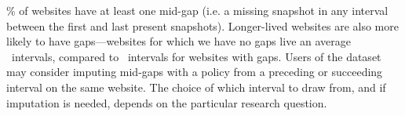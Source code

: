 {\midgapsDomainsPerc\% of websites have at least one mid-gap (i.e. a missing snapshot in any interval between the first and last present snapshots). Longer-lived websites are also more likely to have gaps---websites for which we have no gaps live an average \lifespanNoGaps~intervals, compared to \lifespanGaps~intervals for websites with gaps. Users of the dataset may consider imputing mid-gaps with a policy from a preceding or succeeding interval on the same website. The choice of which interval to draw from, and if imputation is needed, depends on the particular research question.
}
\iffalse

Overall stats (e.g. perc of possible policies that are gaps)
Only do overall stats for websites that have a rank
Gap distribution based on w-i pairs with rank
Focus on mid-gaps, only briefly touch on pre/post gaps
median number of mid-gaps
Optional: how long do mid-gaps run?
Longevity: median(last\_year - start\_year)
\fi

\begin{comment}
For a missing snapshot, we categorize the missing data as follows (also illustrated in Figure \ref{fig:missing_types}):
\begin{itemize}
    \item ``absent'': We have no privacy policies on any interval for that website.
    \item ``gap'': We do not have a privacy policy for that snapshot, but we do for a different interval for the same website.
    \begin{itemize}
        \item ``pre-gaps'': We do not have a privacy policy for a prior interval, but we do for a later interval.
        \item ``mid-gaps'': We have a privacy policy for a prior and a later interval.
        \item ``post-gaps'': We have a privacy policy for a prior interval, but not for a later interval.
    \end{itemize}
\end{itemize}
\end{comment}

